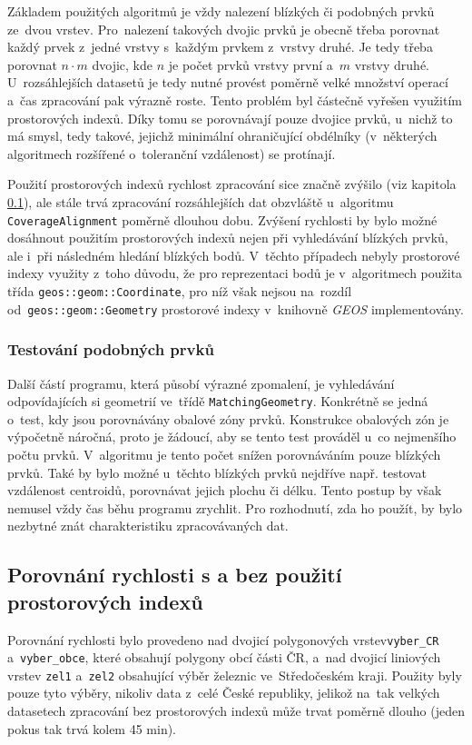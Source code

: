 Základem použitých algoritmů je vždy nalezení blízkých či podobných prvků 
ze~dvou vrstev. Pro~nalezení takových dvojic prvků je obecně třeba porovnat 
každý prvek z~jedné vrstvy s~každým prvkem z~vrstvy druhé. Je tedy třeba 
porovnat $n\cdot m$ dvojic, kde $n$ je počet prvků vrstvy první a~$m$ vrstvy 
druhé. U~rozsáhlejších datasetů je tedy nutné provést poměrně velké množství 
operací a~čas zpracování pak výrazně roste. Tento problém byl částečně vyřešen 
využitím prostorových indexů. Díky tomu se porovnávají pouze dvojice prvků, 
u~nichž to má smysl, tedy takové, jejichž minimální ohraničující obdélníky 
(v~některých algoritmech rozšířené o~toleranční vzdálenost) se protínají.

Použití prostorových indexů rychlost zpracování sice značně zvýšilo (viz 
kapitola \ref{problemy-test}), ale stále trvá zpracování rozsáhlejších dat 
obzvláště u~algoritmu \linebreak[5] \texttt{Coverage\-Alignment} poměrně 
dlouhou dobu. Zvýšení rychlosti by bylo možné dosáhnout použitím prostorových 
indexů nejen při vyhledávání blízkých prvků, ale i~při následném hledání 
blízkých bodů. V~těchto případech nebyly prostorové indexy využity z~toho 
důvodu, že pro reprezentaci bodů je v~algoritmech použita třída 
\texttt{geos::geom::Coordinate}, pro níž však nejsou na~rozdíl 
od~\texttt{geos::geom::Geometry} prostorové indexy v~knihovně \textit{GEOS} 
implementovány.


\subsubsection{Testování podobných prvků}

Další částí programu, která působí výrazné zpomalení, je vyhledávání
odpovídajících si geometrií ve~třídě \texttt{MatchingGeometry}. Konkrétně
se jedná o~test, kdy jsou porovnávány obalové zóny prvků. Konstrukce
obalových zón je výpočetně náročná, proto je žádoucí, aby se tento test
prováděl u~co nejmenšího počtu prvků. V~algoritmu je tento počet snížen
porovnáváním pouze blízkých prvků. Také by bylo možné u~těchto 
blízkých prvků nejdříve např. testovat vzdálenost centroidů, porovnávat
jejich plochu či délku. Tento postup by však nemusel vždy čas běhu programu
zrychlit. Pro rozhodnutí, zda ho použít, by bylo nezbytné znát charakteristiku
zpracovávaných dat.


\subsection{Porovnání rychlosti s a bez použití prostorových indexů}
\label{problemy-test}
Porovnání rychlosti bylo provedeno nad dvojicí polygonových vrstev\linebreak[5] 
\texttt{vyber\_CR} a~\texttt{vyber\_obce}, které obsahují polygony obcí části 
ČR, a~nad dvojicí liniových vrstev \texttt{zel1} a~\texttt{zel2} obsahující 
výběr železnic ve~Středočeském kraji. Použity byly pouze tyto výběry, nikoliv 
data z~celé České republiky, jelikož na~tak velkých datasetech zpracování 
bez prostorových indexů může trvat poměrně dlouho (jeden pokus tak trvá 
kolem 45 min).

